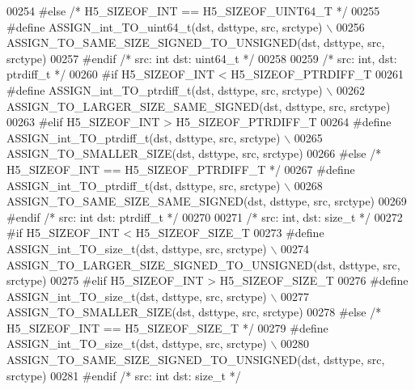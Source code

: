 \begin{DoxyCode}
00254 \textcolor{preprocessor}{#else }\textcolor{comment}{/* H5\_SIZEOF\_INT == H5\_SIZEOF\_UINT64\_T */}\textcolor{preprocessor}{}
00255 \textcolor{preprocessor}{    #define ASSIGN\_int\_TO\_uint64\_t(dst, dsttype, src, srctype) \(\backslash\)}
00256 \textcolor{preprocessor}{        ASSIGN\_TO\_SAME\_SIZE\_SIGNED\_TO\_UNSIGNED(dst, dsttype, src, srctype)}
00257 \textcolor{preprocessor}{#endif }\textcolor{comment}{/* src: int dst: uint64\_t */}\textcolor{preprocessor}{}
00258 
00259 \textcolor{comment}{/* src: int, dst: ptrdiff\_t */}
00260 \textcolor{preprocessor}{#if H5\_SIZEOF\_INT < H5\_SIZEOF\_PTRDIFF\_T}
00261 \textcolor{preprocessor}{    #define ASSIGN\_int\_TO\_ptrdiff\_t(dst, dsttype, src, srctype) \(\backslash\)}
00262 \textcolor{preprocessor}{        ASSIGN\_TO\_LARGER\_SIZE\_SAME\_SIGNED(dst, dsttype, src, srctype)}
00263 \textcolor{preprocessor}{#elif H5\_SIZEOF\_INT > H5\_SIZEOF\_PTRDIFF\_T}
00264 \textcolor{preprocessor}{    #define ASSIGN\_int\_TO\_ptrdiff\_t(dst, dsttype, src, srctype) \(\backslash\)}
00265 \textcolor{preprocessor}{        ASSIGN\_TO\_SMALLER\_SIZE(dst, dsttype, src, srctype)}
00266 \textcolor{preprocessor}{#else }\textcolor{comment}{/* H5\_SIZEOF\_INT == H5\_SIZEOF\_PTRDIFF\_T */}\textcolor{preprocessor}{}
00267 \textcolor{preprocessor}{    #define ASSIGN\_int\_TO\_ptrdiff\_t(dst, dsttype, src, srctype) \(\backslash\)}
00268 \textcolor{preprocessor}{        ASSIGN\_TO\_SAME\_SIZE\_SAME\_SIGNED(dst, dsttype, src, srctype)}
00269 \textcolor{preprocessor}{#endif }\textcolor{comment}{/* src: int dst: ptrdiff\_t */}\textcolor{preprocessor}{}
00270 
00271 \textcolor{comment}{/* src: int, dst: size\_t */}
00272 \textcolor{preprocessor}{#if H5\_SIZEOF\_INT < H5\_SIZEOF\_SIZE\_T}
00273 \textcolor{preprocessor}{    #define ASSIGN\_int\_TO\_size\_t(dst, dsttype, src, srctype) \(\backslash\)}
00274 \textcolor{preprocessor}{        ASSIGN\_TO\_LARGER\_SIZE\_SIGNED\_TO\_UNSIGNED(dst, dsttype, src, srctype)}
00275 \textcolor{preprocessor}{#elif H5\_SIZEOF\_INT > H5\_SIZEOF\_SIZE\_T}
00276 \textcolor{preprocessor}{    #define ASSIGN\_int\_TO\_size\_t(dst, dsttype, src, srctype) \(\backslash\)}
00277 \textcolor{preprocessor}{        ASSIGN\_TO\_SMALLER\_SIZE(dst, dsttype, src, srctype)}
00278 \textcolor{preprocessor}{#else }\textcolor{comment}{/* H5\_SIZEOF\_INT == H5\_SIZEOF\_SIZE\_T */}\textcolor{preprocessor}{}
00279 \textcolor{preprocessor}{    #define ASSIGN\_int\_TO\_size\_t(dst, dsttype, src, srctype) \(\backslash\)}
00280 \textcolor{preprocessor}{        ASSIGN\_TO\_SAME\_SIZE\_SIGNED\_TO\_UNSIGNED(dst, dsttype, src, srctype)}
00281 \textcolor{preprocessor}{#endif }\textcolor{comment}{/* src: int dst: size\_t */}\textcolor{preprocessor}{}

\end{DoxyCode}
